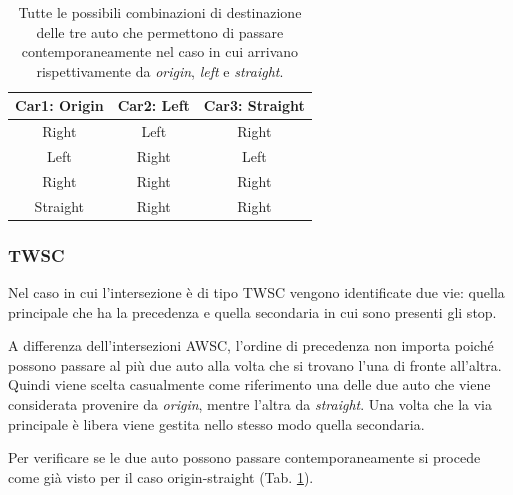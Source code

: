 \begin{table}[ht]
    \centering
    \begin{tabular}{|c|c|c|}
        \hline
        \textbf{Car1: Origin} & \textbf{Car2: Left} & \textbf{Car3: Straight} \\ \hline
        Right                 & Left                & Right                   \\ \hline
        Left                  & Right               & Left                    \\ \hline
        Right                 & Right               & Right                   \\ \hline
        Straight              & Right               & Right                   \\ \hline
    \end{tabular}
    \caption{Tutte le possibili combinazioni di destinazione delle tre auto che permettono
        di passare contemporaneamente nel caso in cui arrivano rispettivamente da \textit{origin}, \textit{left} e \textit{straight}.}
    \label{tab:origin-left-straight}
\end{table}

\subsubsection{TWSC}
Nel caso in cui l'intersezione è di tipo TWSC vengono identificate due vie: quella principale che ha la precedenza e quella
secondaria in cui sono presenti gli stop.

A differenza dell'intersezioni AWSC, l'ordine di precedenza non importa poiché possono passare al più due auto alla volta
che si trovano l'una di fronte all'altra.
Quindi viene scelta casualmente come riferimento una delle due auto che viene considerata provenire da \textit{origin}, mentre
l'altra da \textit{straight}.
%
Una volta che la via principale è libera viene gestita nello stesso modo quella secondaria.

Per verificare se le due auto possono passare contemporaneamente si procede come già visto per il caso origin-straight (Tab. \ref{tab:origin-left-straight}).

